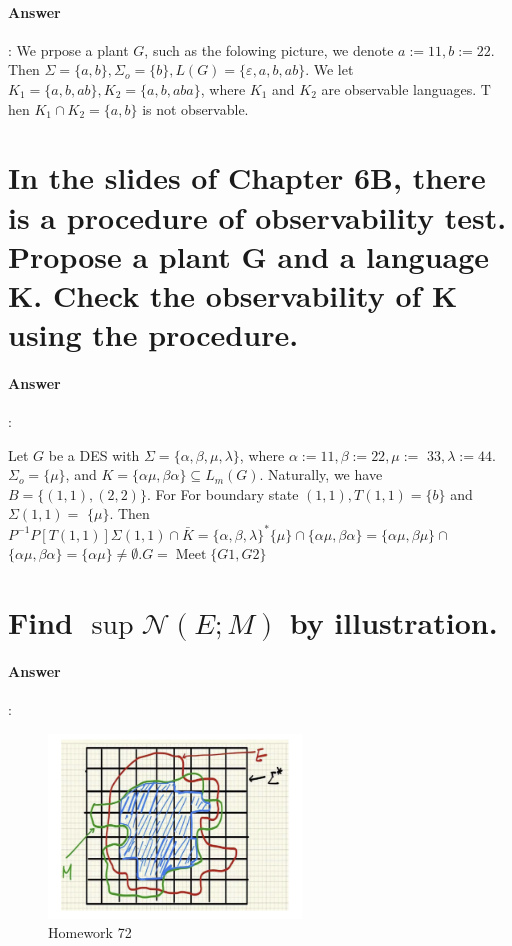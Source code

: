 \documentclass{article}
\begin{document}
\paragraph{Answer}:
We prpose a plant $G$, such as the folowing picture, we denote $a:=11, b:=22$. Then $\Sigma=\{a, b\}, \Sigma_o=\{b\}, L(G)=\{\varepsilon, a, b, a b\}$. We let $K_1=\{a, b, a b\}, K_2=\{a, b, a b a\}$, where $K_1$ and $K_2$ are observable languages. $\mathrm{T}$ hen $K_1 \cap K_2=\{a, b\}$ is not observable.

\section{In the slides of Chapter 6B, there is a procedure of observability test. Propose a plant G and a language K.
Check the observability of K using the procedure.}

\paragraph{Answer}:

Let $G$ be a DES with $\Sigma=\{\alpha, \beta, \mu, \lambda\}$, where $\alpha:=11, \beta:=22, \mu:=$ $33, \lambda:=44$. $\Sigma_o=\{\mu\}$, and $K=\{\alpha \mu, \beta \alpha\} \subseteq L_m(G)$. Naturally, we have $B=\{(1,1),(2,2)\}$. For For boundary state $(1,1), T(1,1)=\{b\}$ and $\Sigma(1,1)=$ $\{\mu\}$. Then $P^{-1} P[T(1,1)] \Sigma(1,1) \cap \bar{K}=\{\alpha, \beta, \lambda\}^*\{\mu\} \cap\{\alpha \mu, \beta \alpha\}=\{\alpha \mu, \beta \mu\} \cap$ $\{\alpha \mu, \beta \alpha\}=\{\alpha \mu\} \neq \emptyset . G=\operatorname{Meet}\{G 1, G 2\}$

\section{Find $\sup \mathcal{N}(E ; M)$  by illustration. }

\paragraph{Answer}:

\begin{figure}[h!]
  \centering
  \includegraphics[width=0.6\textwidth]{assets/DES72.png}
  \caption{Homework 72}
  \label{fig:des72}
\end{figure}
\end{document}
